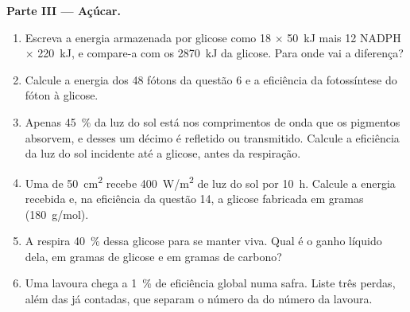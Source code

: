 \begin{problem}
\medskip
\noindent\textbf{Parte III --- Açúcar.}
\begin{enumerate}[resume]
  \item Escreva a energia armazenada por glicose como 18  $\times$
        \qty{50}{kJ} mais 12 NADPH $\times$ \qty{220}{kJ}, e compare-a
        com os \qty{2870}{kJ} da glicose. Para onde vai a diferença?
  \item Calcule a energia dos 48 fótons da questão 6 e a eficiência da
        fotossíntese do fóton à glicose.
  \item Apenas \qty{45}{\%} da luz do sol está nos comprimentos de onda
        que os pigmentos absorvem, e desses um décimo é refletido ou
        transmitido. Calcule a eficiência da luz do sol incidente até a
        glicose, antes da respiração.
  \item Uma  de \qty{50}{cm^2} recebe \qty{400}{W/m^2} de luz do
        sol por \qty{10}{h}. Calcule a energia recebida e, na eficiência
        da questão 14, a glicose fabricada em gramas (\qty{180}{g/mol}).
  \item A  respira \qty{40}{\%} dessa glicose para se manter viva.
        Qual é o ganho líquido dela, em gramas de glicose e em gramas de
        carbono?
  \item Uma lavoura chega a \qty{1}{\%} de eficiência global numa
        safra. Liste três perdas, além das já contadas, que separam o
        número da  do número da lavoura.
\end{enumerate}


\end{problem}
